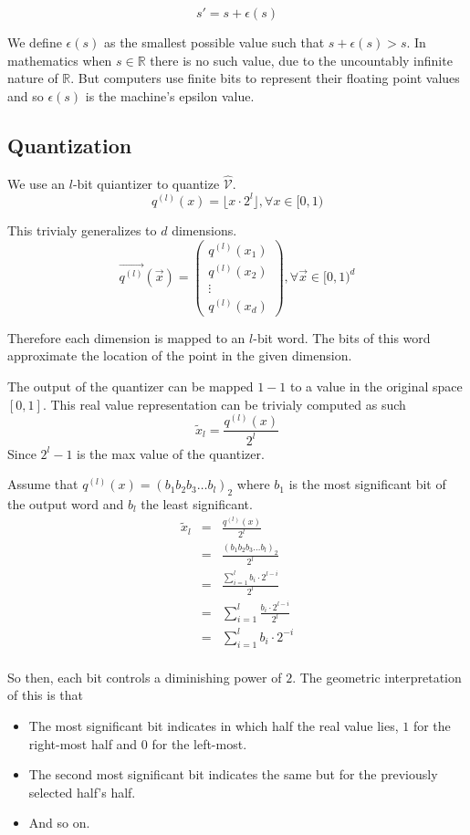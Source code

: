 \documentclass{juliacon}
\begin{document}
$$ s' = s + \epsilon(s) $$

We define $\epsilon(s)$ as the smallest possible value such that $s + \epsilon(s) > s$.
In mathematics when $s \in \mathbb{R}$ there is no such value, due to the uncountably
infinite nature of $\mathbb{R}$. But computers use finite bits to represent their
floating point values and so $\epsilon(s)$ is the machine's epsilon value.

\subsection{Quantization}
We use an $l$-bit quiantizer to quantize $\hat{\mathcal{V}}$.
$$q^{(l)}(x) = \lfloor x \cdot 2^l \rfloor, \forall x \in [0, 1)$$

This trivialy generalizes to $d$ dimensions.
$$\vec{q^{(l)}}(\vec{x}) = \begin{pmatrix}
  q^{(l)}(x_1)\\
  q^{(l)}(x_2)\\
  \vdots \\
  q^{(l)}(x_d)
\end{pmatrix}, \forall \vec{x} \in [0,1)^d$$

Therefore each dimension is mapped to an $l$-bit word. The bits of
this word approximate the location of the point in the given
dimension.


The output of the quantizer can be mapped $1-1$ to a value in the
original space $[0,1]$. This real value representation can be
trivialy computed as such
$$ \tilde{x}_l = \frac{q^{(l)}(x)}{2^l} $$
Since $2^l-1$ is the max value of the quantizer.

Assume that $q^{(l)}(x) = (b_1b_2b_3\dots b_l)_2$ where $b_1$ is the most significant
bit of the output word and $b_l$ the least significant.
$$
\begin{matrix}
  \tilde{x}_l & = & \frac{q^{(l)}(x)}{2^l} \\
              & = & \frac{(b_1b_2b_3\dots b_l)_2}{2^l} \\
              & = & \frac{\sum\limits_{i=1}^{l} b_i \cdot 2^{l-i}}{2^l} \\
              & = & \sum\limits_{i=1}^{l}\frac{b_i \cdot 2^{l-i}}{2^l} \\
              & = & \sum\limits_{i=1}^{l}b_i \cdot 2^{-i} \\
\end{matrix}
$$

So then, each bit controls a diminishing power of $2$. The geometric interpretation of
this is that
\begin{itemize}
  \item The most significant bit indicates in which half the real value lies, $1$
  for the right-most half and $0$ for the left-most.
  \item The second most significant bit indicates the same but for the previously
  selected half's half.
  \item And so on.
\end{itemize}
\end{document}
